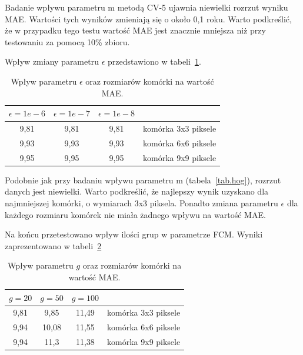 \documentclass[a4paper,twoside,12pt]{book}
\begin{document}
    Badanie wpływu parametru m metodą CV-5 ujawnia niewielki rozrzut wyniku MAE.
    Wartości tych wyników zmieniają się o około 0,1 roku. Warto podkreślić, że w przypadku tego testu wartość MAE jest
    znacznie mniejsza
    niż
    przy testowaniu za pomocą 10\% zbioru.

    Wpływ zmiany parametru $\epsilon$ przedstawiono w tabeli~\ref{tab.hog12}.
    \begin{table}[h!]
        \centering
        \caption{Wpływ parametru $\epsilon$ oraz rozmiarów komórki na wartość MAE.}
        \begin{tabular}{|c|c|c|c|}
            \hline
            $\epsilon=1e-6$ &  $\epsilon=1e-7$ &  $\epsilon=1e-8$ &                     \\ \hline
            9,81 & 9,81 & 9,81 & komórka 3x3 piksele \\ \hline
            9,93 & 9,93 & 9,93 & komórka 6x6 piksele \\ \hline
            9,95 & 9,95 & 9,95 & komórka 9x9 piksele \\ \hline
        \end{tabular}
        \label{tab.hog12}
    \end{table}

    Podobnie jak przy badaniu wpływu parametru m (tabela~\ref{tab.hog}), rozrzut danych jest niewielki. Warto
    podkreślić, że najlepszy wynik uzyskano dla najmniejszej komórki, o wymiarach 3x3 piksela. Ponadto zmiana
    parametru $\epsilon$ dla
    każdego rozmiaru komórek nie miała żadnego wpływu na wartość MAE.

    Na końcu przetestowano wpływ ilości grup w parametrze FCM.
    Wyniki zaprezentowano w tabeli~\ref{tab.hog21}
    \begin{table}[h!]
        \centering
        \caption{Wpływ parametru $g$ oraz rozmiarów komórki na wartość MAE.}
        \begin{tabular}{|c|c|c|c|}
            \hline
            $g=20$ & $g=50$ & $g=100$ &                     \\ \hline
            9,81 & 9,85 & 11,49 & komórka 3x3 piksele \\ \hline
            9,94 & 10,08 & 11,55 & komórka 6x6 piksele \\ \hline
            9,94 & 11,3 & 11,38 & komórka 9x9 piksele \\ \hline
        \end{tabular}
        \label{tab.hog21}
    \end{table}
\end{document}
